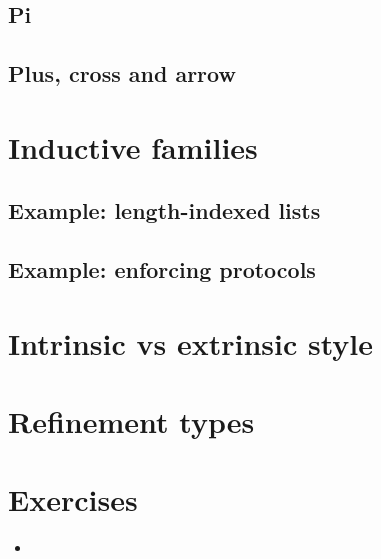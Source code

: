 \documentclass{beamer}
\begin{document}
\subsection{Pi}

\subsection{Plus, cross and arrow}


\section{Inductive families}

\subsection{Example: length-indexed lists}

\subsection{Example: enforcing protocols}

\section{Intrinsic vs extrinsic style}

\section{Refinement types}

\section{Exercises}

\begin{frame}{}
\begin{itemize}
	\item 
\end{itemize}
\end{frame}
\end{document}
